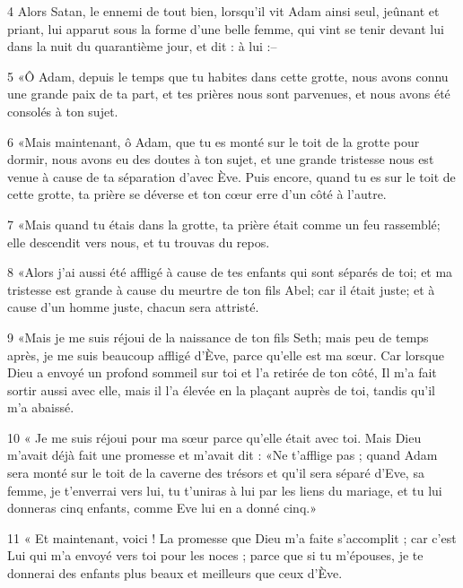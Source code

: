 \par 4 Alors Satan, le ennemi de tout bien, lorsqu'il vit Adam ainsi seul, jeûnant et priant, lui apparut sous la forme d'une belle femme, qui vint se tenir devant lui dans la nuit du quarantième jour, et dit : à lui :--

\par 5 «Ô Adam, depuis le temps que tu habites dans cette grotte, nous avons connu une grande paix de ta part, et tes prières nous sont parvenues, et nous avons été consolés à ton sujet.

\par 6 «Mais maintenant, ô Adam, que tu es monté sur le toit de la grotte pour dormir, nous avons eu des doutes à ton sujet, et une grande tristesse nous est venue à cause de ta séparation d'avec Ève. Puis encore, quand tu es sur le toit de cette grotte, ta prière se déverse et ton cœur erre d'un côté à l'autre.

\par 7 «Mais quand tu étais dans la grotte, ta prière était comme un feu rassemblé; elle descendit vers nous, et tu trouvas du repos.

\par 8 «Alors j'ai aussi été affligé à cause de tes enfants qui sont séparés de toi; et ma tristesse est grande à cause du meurtre de ton fils Abel; car il était juste; et à cause d'un homme juste, chacun sera attristé.

\par 9 «Mais je me suis réjoui de la naissance de ton fils Seth; mais peu de temps après, je me suis beaucoup affligé d'Ève, parce qu'elle est ma sœur. Car lorsque Dieu a envoyé un profond sommeil sur toi et l'a retirée de ton côté, Il m'a fait sortir aussi avec elle, mais il l'a élevée en la plaçant auprès de toi, tandis qu'il m'a abaissé.

\par 10 « Je me suis réjoui pour ma sœur parce qu'elle était avec toi. Mais Dieu m'avait déjà fait une promesse et m'avait dit : «Ne t'afflige pas ; quand Adam sera monté sur le toit de la caverne des trésors et qu'il sera séparé d'Eve, sa femme, je t'enverrai vers lui, tu t'uniras à lui par les liens du mariage, et tu lui donneras cinq enfants, comme Eve lui en a donné cinq.»

\par 11 « Et maintenant, voici ! La promesse que Dieu m'a faite s'accomplit ; car c'est Lui qui m'a envoyé vers toi pour les noces ; parce que si tu m'épouses, je te donnerai des enfants plus beaux et meilleurs que ceux d'Ève.

